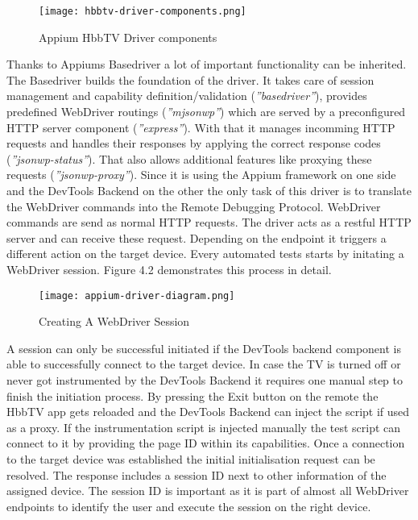 \vspace{1cm}
\begin{figure}[htb]
  \centering
  \texttt{[image: hbbtv-driver-components.png]}\\
  \caption{Appium HbbTV Driver components}\label{fig:hbbtv-driver-components}
\end{figure}
\vspace{0.5cm}

Thanks to Appiums Basedriver a lot of important functionality can be inherited. The Basedriver
builds the foundation of the driver. It takes care of session management and capability
definition/validation (\textit{''basedriver''}), provides predefined WebDriver routings
(\textit{''mjsonwp''}) which are served by a preconfigured HTTP server component
(\textit{''express''}). With that it manages incomming HTTP requests and handles their responses
by applying the correct response codes (\textit{''jsonwp-status''}). That also allows additional
features like proxying these requests (\textit{''jsonwp-proxy''}). Since it is using the Appium
framework on one side and the DevTools Backend on the other the only task of this driver is to
translate the WebDriver commands into the Remote Debugging Protocol. WebDriver commands are send
as normal HTTP requests. The driver acts as a restful HTTP server and can receive these request.
Depending on the endpoint it triggers a different action on the target device. Every automated
tests starts by initating a WebDriver session. Figure 4.2 demonstrates this process in detail.

\vspace{1cm}
\begin{figure}[htb]
  \centering
  \texttt{[image: appium-driver-diagram.png]}\\
  \caption{Creating A WebDriver Session}\label{fig:appium-driver-diagram}
\end{figure}
\vspace{0.5cm}

A session can only be successful initiated if the DevTools backend component is able to successfully
connect to the target device. In case the TV is turned off or never got instrumented by the DevTools
Backend it requires one manual step to finish the initiation process. By pressing the Exit button
on the remote the HbbTV app gets reloaded and the DevTools Backend can inject the script if used as
a proxy. If the instrumentation script is injected manually the test script can connect to it by
providing the page ID within its capabilities. Once a connection to the target device was established
the initial initialisation request can be resolved. The response includes a session ID next to other
information of the assigned device. The session ID is important as it is part of almost all WebDriver
endpoints to identify the user and execute the session on the right device.

